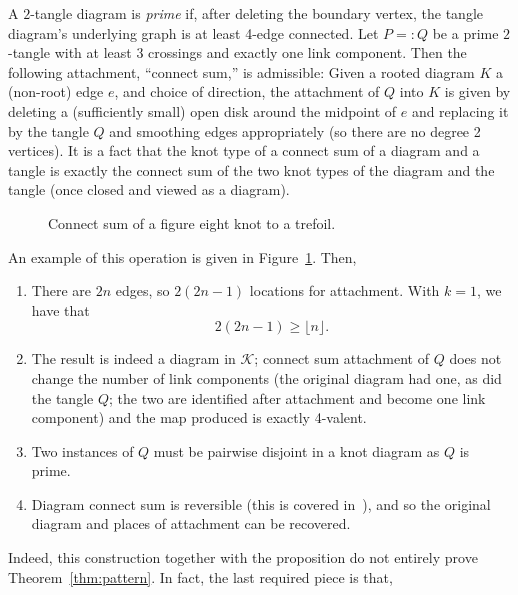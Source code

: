 \documentclass[submission%
]{dmtcs}
\newcommand{\KnotDiaClass}{\mathscr{K}}
\begin{document}
A $2$-tangle diagram is \emph{prime} if, after deleting the boundary
vertex, the tangle diagram's underlying graph is at least 4-edge
connected. Let $P =: Q$ be a prime $2$-tangle with at least $3$
crossings and exactly one link component. Then the following
attachment, ``connect sum,'' is admissible: Given a rooted diagram $K$
a (non-root) edge $e$, and choice of direction, the attachment of $Q$
into $K$ is given by deleting a (sufficiently small) open disk around
the midpoint of $e$ and replacing it by the tangle $Q$ and smoothing
edges appropriately (so there are no degree 2 vertices). It is a fact
that the knot type of a connect sum of a diagram and a tangle is
exactly the connect sum of the two knot types of the diagram and the
tangle (once closed and viewed as a diagram).
\begin{figure}[hbtp]
  \centering
  \hfil
  \hfil
  \caption{Connect sum of a figure eight knot to a trefoil.}
  \label{fig:csexample}
\end{figure}
An example of
this operation is given in Figure~\ref{fig:csexample}. Then,
\begin{enumerate}
\item There are $2n$ edges, so $2(2n-1)$ locations for
  attachment. With $k = 1$, we have that
  \begin{displaymath}
    2(2n-1) \ge \lfloor n \rfloor.
  \end{displaymath}
\item The result is indeed a diagram in $\KnotDiaClass$; connect sum
  attachment of $Q$ does not change the number of link components (the
  original diagram had one, as did the tangle $Q$; the two are
  identified after attachment and become one link component) and the
  map produced is exactly 4-valent.
\item Two instances of $Q$ must be pairwise disjoint in a knot diagram
  as $Q$ is prime.
\item Diagram connect sum is reversible (this is covered
  in~\cite{CCMknotdiagrams2015}), and so the original diagram and
  places of attachment can be recovered.
\end{enumerate}

Indeed, this construction together with the proposition do not
entirely prove Theorem~\ref{thm:pattern}. In fact, the last required
piece is that,
\end{document}
